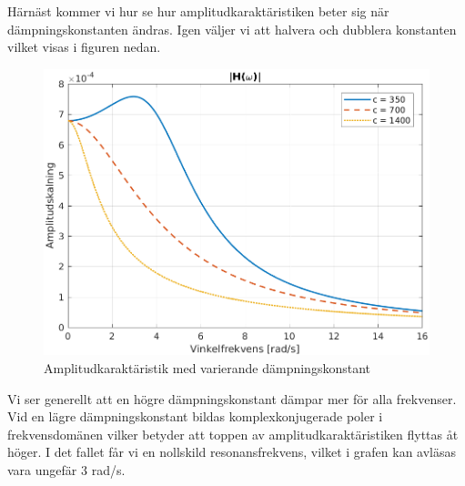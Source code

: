 \newpage
Härnäst kommer vi hur se hur amplitudkaraktäristiken beter sig när dämpningskonstanten ändras. Igen väljer vi att halvera och dubblera konstanten vilket visas i figuren nedan.  
\begin{figure}[H]
    \centering
    \includegraphics[scale=0.9]{bilder/amplitudkaraktaristik_variation_c}
    \caption{Amplitudkaraktäristik med varierande dämpningskonstant}
    \label{fig:amplitudkaraktaristik_variation_c}
\end{figure}
Vi ser generellt att en högre dämpningskonstant dämpar mer för alla frekvenser. Vid en lägre dämpningskonstant bildas komplexkonjugerade poler i frekvensdomänen vilker betyder att toppen av amplitudkaraktäristiken flyttas åt höger. I det fallet får vi en nollskild resonansfrekvens, vilket i grafen kan avläsas vara ungefär $3$ rad/s. 

\newpage
